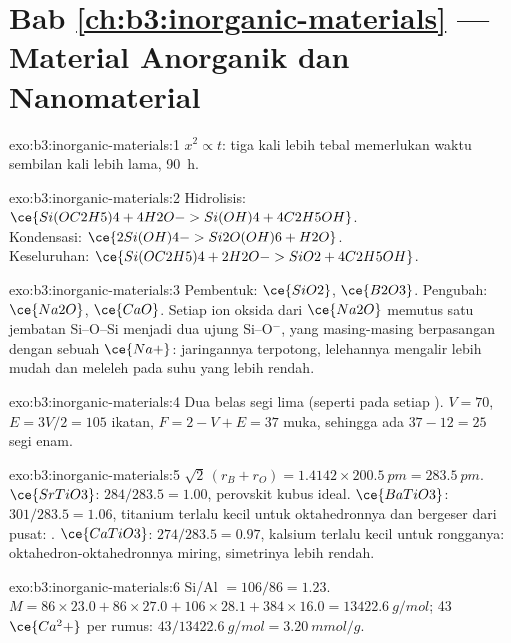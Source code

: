 \section*{Bab \ref{ch:b3:inorganic-materials} --- Material Anorganik dan Nanomaterial}

\begin{solution}{exo:b3:inorganic-materials:1}
$x^2 \propto t$: tiga kali lebih tebal memerlukan waktu sembilan kali lebih lama, \qty{90}{h}.
\end{solution}

\begin{solution}{exo:b3:inorganic-materials:2}
Hidrolisis: $\ce{Si(OC2H5)4 + 4H2O -> Si(OH)4 + 4C2H5OH}$.\\
Kondensasi: $\ce{2Si(OH)4 -> Si2O(OH)6 + H2O}$.\\
Keseluruhan: $\ce{Si(OC2H5)4 + 2H2O -> SiO2 + 4C2H5OH}$.
\end{solution}

\begin{solution}{exo:b3:inorganic-materials:3}
Pembentuk: $\ce{SiO2}$, $\ce{B2O3}$. Pengubah: $\ce{Na2O}$, $\ce{CaO}$. Setiap ion oksida dari $\ce{Na2O}$ memutus satu jembatan Si--O--Si
menjadi dua ujung Si--O$^-$, yang masing-masing berpasangan dengan sebuah $\ce{Na+}$: jaringannya terpotong, lelehannya
mengalir lebih mudah dan meleleh pada suhu yang lebih rendah.
\end{solution}

\begin{solution}{exo:b3:inorganic-materials:4}
Dua belas segi lima (seperti pada setiap ). $V = 70$, $E = 3V/2 = 105$ ikatan, $F = 2 - V + E = 37$
muka, sehingga ada $37 - 12 = 25$ segi enam.
\end{solution}

\begin{solution}{exo:b3:inorganic-materials:5}
$\sqrt2\,(r_B + r_O) = 1.4142 \times \qty{200.5}{pm} = \qty{283.5}{pm}$. $\ce{SrTiO3}$: $284/283.5 = 1.00$, perovskit kubus ideal.
$\ce{BaTiO3}$: $301/283.5 = 1.06$, titanium terlalu kecil untuk oktahedronnya dan bergeser dari pusat: .
$\ce{CaTiO3}$: $274/283.5 = 0.97$, kalsium terlalu kecil untuk rongganya: oktahedron-oktahedronnya miring, simetrinya
lebih rendah.
\end{solution}

\begin{solution}{exo:b3:inorganic-materials:6}
Si/Al $= 106/86 = 1.23$. $M = 86 \times 23.0 + 86 \times 27.0 + 106 \times 28.1 + 384 \times 16.0 = \qty{13422.6}{g/mol}$; 43 $\ce{Ca^2+}$ per
rumus: $43/\qty{13422.6}{g/mol} = \qty{3.20}{mmol/g}$.
\end{solution}


